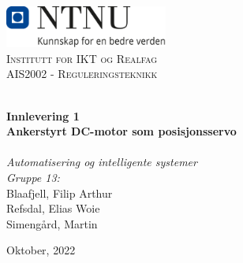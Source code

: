 
\begin{titlepage}
\vbox{ }
\vbox{ }
\begin{center}
\includegraphics[width=0.40\textwidth]{Images/NTNU_logo.png}\\[1cm]
\textsc{\LARGE Institutt for IKT og Realfag}\\[1.5cm]
\textsc{\Large AIS2002 - Reguleringsteknikk}\\[0.5cm]
\vbox{ }

\HRule \\[0.4cm]

{ \huge \bfseries Innlevering 1}\\[0.4cm]
{ \large \bfseries Ankerstyrt DC-motor som posisjonsservo}\\[0.4cm]
\HRule \\[1.5cm]

\large
\emph{Automatisering og intelligente systemer}\\ [0.2mm]
\emph{Gruppe 13:}\\[0.2cm]
Blaafjell, Filip Arthur\\[0.1cm]
Refsdal, Elias Woie\\[0.1cm]
Simengård, Martin
\vfill

{\large Oktober, 2022}
\end{center}
\end{titlepage}